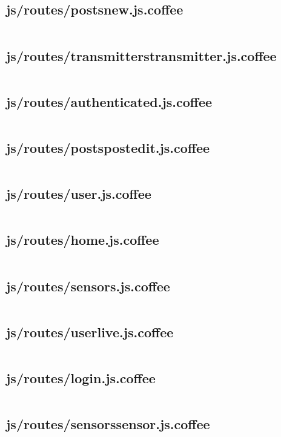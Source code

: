 \documentclass[letterpaper, 12 pt]{article}
\begin{document}
\subsection{js/routes/posts\textunderscore new.js.coffee}
\inputminted{ruby}{../app/assets/javascripts/routes/posts_new.js.coffee}
\subsection{js/routes/transmitters\textunderscore transmitter.js.coffee}
\inputminted{ruby}{../app/assets/javascripts/routes/transmitters_transmitter.js.coffee}
\subsection{js/routes/authenticated.js.coffee}
\inputminted{ruby}{../app/assets/javascripts/routes/authenticated.js.coffee}
\subsection{js/routes/posts\textunderscore post\textunderscore edit.js.coffee}
\inputminted{ruby}{../app/assets/javascripts/routes/posts_post_edit.js.coffee}
\subsection{js/routes/user.js.coffee}
\inputminted{ruby}{../app/assets/javascripts/routes/user.js.coffee}
\subsection{js/routes/home.js.coffee}
\inputminted{ruby}{../app/assets/javascripts/routes/home.js.coffee}
\subsection{js/routes/sensors.js.coffee}
\inputminted{ruby}{../app/assets/javascripts/routes/sensors.js.coffee}
\subsection{js/routes/user\textunderscore live.js.coffee}
\inputminted{ruby}{../app/assets/javascripts/routes/user_live.js.coffee}
\subsection{js/routes/login.js.coffee}
\inputminted{ruby}{../app/assets/javascripts/routes/login.js.coffee}
\subsection{js/routes/sensors\textunderscore sensor.js.coffee}
\inputminted{ruby}{../app/assets/javascripts/routes/sensors_sensor.js.coffee}
\end{document}
